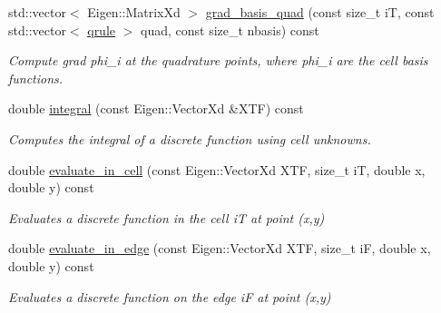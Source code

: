 \begin{DoxyCompactItemize}
std\+::vector$<$ Eigen\+::\+Matrix\+Xd $>$ \hyperlink{classHArDCore2D_1_1HybridCore_a14adb4f4cfdd2dc7f9be9bfd085e7d87}{grad\+\_\+basis\+\_\+quad} (const size\+\_\+t iT, const std\+::vector$<$ \hyperlink{structHArDCore2D_1_1HybridCore_1_1qrule}{qrule} $>$ quad, const size\+\_\+t nbasis) const
\begin{DoxyCompactList}\small\item\em Compute \textquotesingle{}grad phi\+\_\+i\textquotesingle{} at the quadrature points, where phi\+\_\+i are the cell basis functions. \end{DoxyCompactList}\item 
\mbox{\label{classHArDCore2D_1_1HybridCore_aed85cdfc0bb96c65ce201528366e92f8}} 
double \hyperlink{classHArDCore2D_1_1HybridCore_aed85cdfc0bb96c65ce201528366e92f8}{integral} (const Eigen\+::\+Vector\+Xd \&X\+TF) const
\begin{DoxyCompactList}\small\item\em Computes the integral of a discrete function using cell unknowns. \end{DoxyCompactList}\item 
\mbox{\label{classHArDCore2D_1_1HybridCore_a58dd478934c1f5b65ae8b7df31e8ead4}} 
double \hyperlink{classHArDCore2D_1_1HybridCore_a58dd478934c1f5b65ae8b7df31e8ead4}{evaluate\+\_\+in\+\_\+cell} (const Eigen\+::\+Vector\+Xd X\+TF, size\+\_\+t iT, double x, double y) const
\begin{DoxyCompactList}\small\item\em Evaluates a discrete function in the cell iT at point (x,y) \end{DoxyCompactList}\item 
\mbox{\label{classHArDCore2D_1_1HybridCore_ae6795e8bc0058be7e399b379333032c8}} 
double \hyperlink{classHArDCore2D_1_1HybridCore_ae6795e8bc0058be7e399b379333032c8}{evaluate\+\_\+in\+\_\+edge} (const Eigen\+::\+Vector\+Xd X\+TF, size\+\_\+t iF, double x, double y) const
\begin{DoxyCompactList}\small\item\em Evaluates a discrete function on the edge iF at point (x,y) \end{DoxyCompactList}\item 
\mbox{\label{classHArDCore2D_1_1HybridCore_a74242d0a8b68fe5d9a35c6eb0effe3b2}} 

\end{DoxyCompactItemize}
